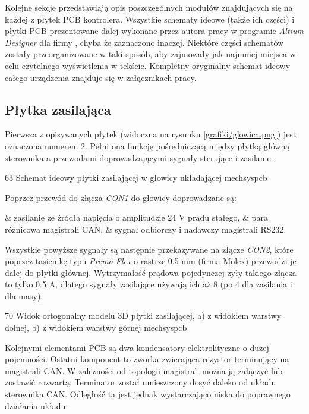 Kolejne sekcje przedstawiają opis poszczególnych modułów znajdujących się na każdej z płytek PCB kontrolera. Wszystkie schematy ideowe (także ich części) i płytki PCB prezentowane dalej wykonane przez autora pracy w programie {\it Altium Designer} dla firmy \firma{}, chyba że zaznaczono inaczej. Niektóre części schematów zostały przeorganizowane w taki sposób, aby zajmowały jak najmniej miejsca w celu czytelnego wyświetlenia w tekście. Kompletny oryginalny schemat ideowy całego urządzenia znajduje się w załącznikach pracy.

\subsection{Płytka zasilająca}
\label{ss:power_board}

Pierwsza z opisywanych płytek (widoczna na rysunku \ref{grafiki/glowica.png}) jest oznaczona numerem 2. Pełni ona funkcję pośredniczącą między płytką główną sterownika a przewodami doprowadzającymi sygnały sterujące i zasilanie.

	{63}
	{Schemat ideowy płytki zasilającej w głowicy układającej}
	{mechsyspcb}
	
Poprzez przewód do złącza {\it CON1} do głowicy doprowadzane są:

\begin{easylist}
	& zasilanie ze źródła napięcia o amplitudzie 24 V prądu stałego,
	& para różnicowa magistrali CAN,
	& sygnał odbiorczy i nadawczy magistrali RS232.
	\\
\end{easylist} 

Wszystkie powyższe sygnały są następnie przekazywane na złącze {\it CON2}, które poprzez tasiemkę typu {\it Premo-Flex} o rastrze 0.5 mm (firma Molex) przewodzi je dalej do płytki głównej. Wytrzymałość prądowa pojedynczej żyły takiego złącza to tylko 0.5 A, dlatego sygnały zasilające używają ich aż 8 (po 4 dla zasilania i dla masy).

	{70}
	{Widok ortogonalny modelu 3D płytki zasilającej, a) z widokiem warstwy dolnej, b) z widokiem warstwy górnej}
	{mechsyspcb}

Kolejnymi elementami PCB są dwa kondensatory elektrolityczne o dużej pojemności. Ostatni komponent to zworka zwierająca rezystor terminujący na magistrali CAN. W zależności od topologii magistrali można ją załączyć lub zostawić rozwartą. Terminator został umieszczony dosyć daleko od układu sterownika CAN. Odległość ta jest jednak wystarczająco niska do poprawnego działania układu.

